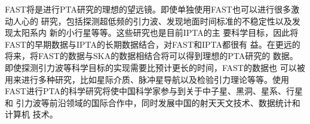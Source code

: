 FAST将是进行PTA研究的理想的望远镜。即使单独使用FAST也可以进行很多激动人心的
研究，包括探测超低频的引力波、发现地面时间标准的不稳定性以及发现太阳系内
新的小行星等等。这些研究也是目前IPTA的主
要科学目标，因此将FAST的早期数据与IPTA的长期数据结合，对FAST和IPTA都很有
益。在更远的将来，将FAST的数据与SKA的数据相结合将可以得到理想的PTA研究的
数据。即使探测引力波等科学目标的实现需要比预计更长的时间，FAST的数据也
可以被用来进行多种研究，比如星际介质、脉冲星导航以及检验引力理论等等。使用
FAST进行PTA的科学研究将使中国科学家参与到关于中子星、黑洞、星系、行星和
引力波等前沿领域的国际合作中，同时发展中国的射天天文技术、数据统计和计算机
技术。


\pkuthssffaq

